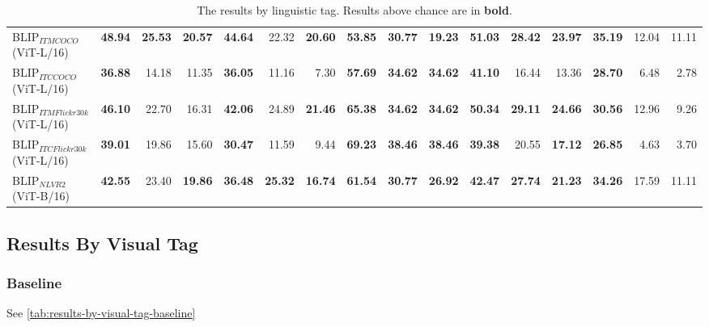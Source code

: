 \begin{table}[ht]
\begin{adjustbox}{max width=\textwidth}
\begin{tabular}{l|rrr|rrr|rrr|rrr|rrr}
 BLIP$_{ITM COCO}$ (ViT-L/16)        & \textbf{48.94} & \textbf{25.53} & \textbf{20.57} & \textbf{44.64} & 22.32          & \textbf{20.60} & \textbf{53.85} & \textbf{30.77} & \textbf{19.23} & \textbf{51.03} & \textbf{28.42} & \textbf{23.97} & \textbf{35.19} & 12.04          & 11.11          \\
 BLIP$_{ITC COCO}$ (ViT-L/16)        & \textbf{36.88} & 14.18          & 11.35          & \textbf{36.05} & 11.16          & 7.30           & \textbf{57.69} & \textbf{34.62} & \textbf{34.62} & \textbf{41.10} & 16.44          & 13.36          & \textbf{28.70} & 6.48           & 2.78           \\
 BLIP$_{ITM Flickr30k}$ (ViT-L/16)   & \textbf{46.10} & 22.70          & 16.31          & \textbf{42.06} & 24.89          & \textbf{21.46} & \textbf{65.38} & \textbf{34.62} & \textbf{34.62} & \textbf{50.34} & \textbf{29.11} & \textbf{24.66} & \textbf{30.56} & 12.96          & 9.26           \\
 BLIP$_{ITC Flickr30k}$ (ViT-L/16)   & \textbf{39.01} & 19.86          & 15.60          & \textbf{30.47} & 11.59          & 9.44           & \textbf{69.23} & \textbf{38.46} & \textbf{38.46} & \textbf{39.38} & 20.55          & \textbf{17.12} & \textbf{26.85} & 4.63           & 3.70           \\
 BLIP$_{NLVR2}$ (ViT-B/16)           & \textbf{42.55} & 23.40          & \textbf{19.86} & \textbf{36.48} & \textbf{25.32} & \textbf{16.74} & \textbf{61.54} & \textbf{30.77} & \textbf{26.92} & \textbf{42.47} & \textbf{27.74} & \textbf{21.23} & \textbf{34.26} & 17.59          & 11.11    \\
          \bottomrule
  \end{tabular}
  \end{adjustbox}
  \caption{The results by linguistic tag. Results above chance are in \textbf{bold}.}
    \label{tab:results-by-ling-tag-ours}
\end{table}

\subsection{Results By Visual Tag}

\subsubsection{Baseline}

See \cref{tab:results-by-visual-tag-baseline}

